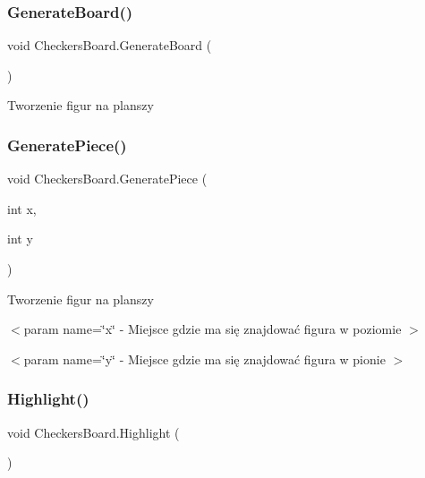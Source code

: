 \subsubsection{\texorpdfstring{GenerateBoard()}{GenerateBoard()}}
{\footnotesize\ttfamily void Checkers\+Board.\+Generate\+Board (\begin{DoxyParamCaption}{ }\end{DoxyParamCaption})\hspace{0.3cm}{\ttfamily [private]}}



Tworzenie figur na planszy 

\mbox{\label{class_checkers_board_aea3617cd6463f7b4d01ab8688ecec3ad}} 
\subsubsection{\texorpdfstring{GeneratePiece()}{GeneratePiece()}}
{\footnotesize\ttfamily void Checkers\+Board.\+Generate\+Piece (\begin{DoxyParamCaption}\item[{int}]{x,  }\item[{int}]{y }\end{DoxyParamCaption})\hspace{0.3cm}{\ttfamily [private]}}



Tworzenie figur na planszy 

$<$param name=\char`\"{}x\char`\"{} -\/ Miejsce gdzie ma się znajdować figura w poziomie $>$

$<$param name=\char`\"{}y\char`\"{} -\/ Miejsce gdzie ma się znajdować figura w pionie $>$\mbox{\label{class_checkers_board_a7b684b257525287c52741b1e6d2ae30a}} 
\subsubsection{\texorpdfstring{Highlight()}{Highlight()}}
{\footnotesize\ttfamily void Checkers\+Board.\+Highlight (\begin{DoxyParamCaption}{ }\end{DoxyParamCaption})\hspace{0.3cm}{\ttfamily [private]}}



